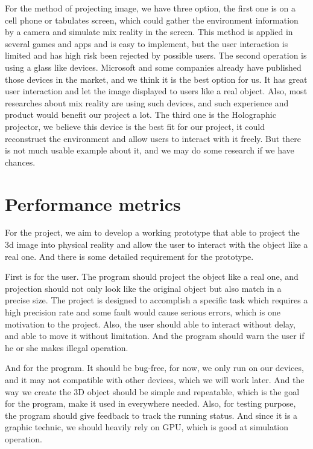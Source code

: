 \documentclass[10pt,letter paper]{article}
\begin{document}
    For the method of projecting image, we have three option, the first one is on a cell phone or tabulates screen, which could gather the environment information by a camera and simulate mix reality in the screen. This method is applied in several games and apps and is easy to implement, but the user interaction is limited and has high risk been rejected by possible users.  The second operation is using a glass like devices. Microsoft and some companies already have published those devices in the market, and we think it is the best option for us. It has great user interaction and let the image displayed to users like a real object. Also, most researches about mix reality are using such devices, and such experience and product would benefit our project a lot. The third one is the Holographic projector, we believe this device is the best fit for our project, it could reconstruct the environment and allow users to interact with it freely. But there is not much usable example about it, and we may do some research if we have chances.\newline \par


\section*{Performance metrics }
    \bigskip
    For the project, we aim to develop a working prototype that able to project the 3d image into physical reality and allow the user to interact with the object like a real one. And there is some detailed requirement for the prototype.\newline \par

    First is for the user. The program should project the object like a real one, and projection should not only look like the original object but also match in a precise size. The project is designed to accomplish a specific task which requires a high precision rate and some fault would cause serious errors, which is one motivation to the project. Also, the user should able to interact without delay, and able to move it without limitation. And the program should warn the user if he or she makes illegal operation.\newline \par

    And for the program. It should be bug-free, for now, we only run on our devices, and it may not compatible with other devices, which we will work later. And the way we create the 3D object should be simple and repeatable, which is the goal for the program, make it used in everywhere needed. Also, for testing purpose, the program should give feedback to track the running status. And since it is a graphic technic, we should heavily rely on GPU, which is good at simulation operation.\newline \par
\end{document}
